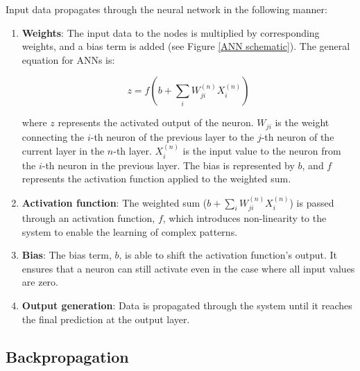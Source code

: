 Input data propagates through the neural network in the following manner:
\begin{enumerate}
	\item \textbf{Weights}: The input data to the nodes is multiplied by corresponding weights, and a bias term is added (see Figure \ref{ANN schematic}). The general equation for ANNs is:
	
	\begin{equation}\label{Generalized ANN1}
		z = f(b+\sum_i W_{j i}^{(n)} X_i^{(n)})
	\end{equation}
	
	where $z$ represents the activated output of the neuron. $W_{j i}$ is the weight connecting the $i$-th neuron of the previous layer to the $j$-th neuron of the current layer in the $n$-th layer. $X_i^{(n)}$ is the input value to the neuron from the $i$-th neuron in the previous layer. The bias is represented by $b$, and $f$ represents the activation function applied to the weighted sum.
	
	\item \textbf{Activation function}: The weighted sum ($b+\sum_i W_{j i}^{(n)} X_i^{(n)}$) is passed through an activation function, $f$, which introduces non-linearity to the system to enable the learning of complex patterns.
	
	\item \textbf{Bias}: The bias term, $b$, is able to shift the activation function's output. It ensures that a neuron can still activate even in the case where all input values are zero.
	
	\item \textbf{Output generation}: Data is propagated through the system until it reaches the final prediction at the output layer.
\end{enumerate}

\subsection{Backpropagation}

